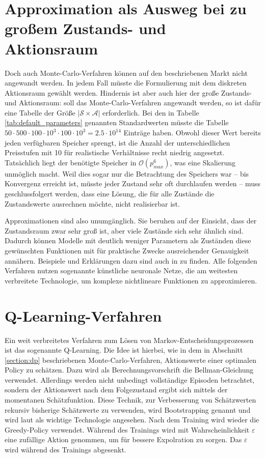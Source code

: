 \section{Approximation als Ausweg bei zu großem Zustands- und Aktionsraum}
Doch auch Monte-Carlo-Verfahren können auf den beschriebenen Markt nicht angewandt werden.
In jedem Fall müsste die Formulierung mit dem diskreten Aktionsraum gewählt werden.
Hindernis ist aber auch hier der große Zustands- und Aktionsraum: soll das Monte-Carlo-Verfahren angewandt werden, so ist dafür eine Tabelle der Größe $|\mathcal{S} \times \mathcal{A}|$ erforderlich.
Bei den in Tabelle \ref{tab:default_parameters} genannten Standardwerten müsste die Tabelle $50 \cdot 500 \cdot 100 \cdot 10^3 \cdot 100 \cdot 10^3 = 2.5 \cdot 10^{14}$ Einträge haben.
Obwohl dieser Wert bereits jeden verfügbaren Speicher sprengt, ist die Anzahl der unterschiedlichen Preisstufen mit 10 für realistische Verhältnisse recht niedrig angesetzt.
Tatsächlich liegt der benötigte Speicher in $\mathcal{O}\left(p_{max}^6\right)$, was eine Skalierung unmöglich macht.
Weil dies sogar nur die Betrachtung des Speichers war -- bis Konvergenz erreicht ist, müsste jeder Zustand sehr oft durchlaufen werden -- muss geschlussfolgert werden, dass eine Lösung, die für alle Zustände die Zustandswerte ausrechnen möchte, nicht realisierbar ist.

Approximationen sind also unumgänglich.
Sie beruhen auf der Einsicht, dass der Zustandsraum zwar sehr groß ist, aber viele Zustände sich sehr ähnlich sind.
Dadurch können Modelle mit deutlich weniger Parametern als Zuständen diese gewünschten Funktionen  mit für praktische Zwecke ausreichender Genauigkeit annähern.
Beispiele und Erklärungen dazu sind auch in \cite{lapan2020deep} zu finden.
Alle folgenden Verfahren nutzen sogenannte künstliche neuronale Netze, die am weitesten verbreitete Technologie, um komplexe nichtlineare Funktionen zu approximieren.

\section{Q-Learning-Verfahren}
\label{section:qlearning}
Ein weit verbreitetes Verfahren zum Lösen von Markov-Entscheidungsprozessen ist das sogenannte Q-Learning.
Die Idee ist hierbei, wie in dem in Abschnitt \ref{section:dp} beschriebenen Monte-Carlo-Verfahren, Aktionswerte einer optimalen Policy zu schätzen.
Dazu wird als Berechnungsvorschrift die Bellman-Gleichung verwendet.
Allerdings werden nicht unbedingt vollständige Episoden betrachtet, sondern der Aktionswert nach dem Folgezustand ergibt sich mittels der momentanen Schätzfunktion.
Diese Technik, zur Verbesserung von Schätzwerten rekursiv bisherige Schätzwerte zu verwenden, wird Bootstrapping genannt und wird laut \cite{Sutton1998} als wichtige Technologie angesehen.
Nach dem Training wird wieder die Greedy-Policy verwendet.
Während des Trainings wird mit Wahrscheinlichkeit $\varepsilon$ eine zufällige Aktion genommen, um für bessere Expolration zu sorgen.
Das $\varepsilon$ wird während des Trainings abgesenkt.

